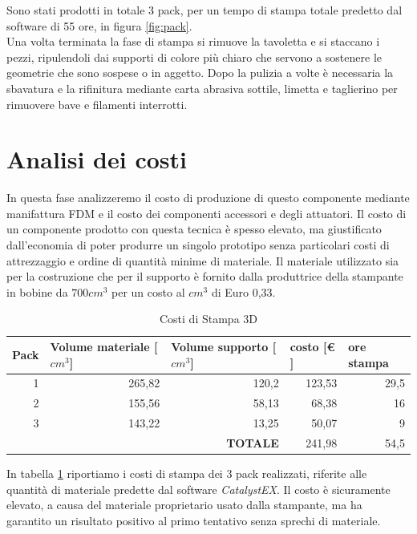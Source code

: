 \documentclass[%
corpo=11pt,
twoside,
 stile=classica,
oldstyle,
greek,%
]{toptesi}
\begin{document}
	Sono stati prodotti in totale 3 pack, per un tempo di stampa totale predetto dal software di 55 ore, in figura \ref{fig:pack}.\\
	Una volta terminata la fase di stampa si rimuove la tavoletta e si staccano i pezzi, ripulendoli dai supporti di colore più chiaro che servono a sostenere le geometrie che sono sospese o in aggetto. 
	Dopo la pulizia a volte è necessaria la sbavatura e la rifinitura mediante carta abrasiva sottile, limetta e taglierino per rimuovere bave e filamenti interrotti. 
	
	\section{Analisi dei costi}
	In questa fase analizzeremo il costo di produzione di questo componente mediante manifattura FDM e il costo dei componenti accessori e degli attuatori. 
	Il costo di un componente prodotto con questa tecnica è spesso elevato, ma giustificato dall'economia di poter produrre un singolo prototipo senza particolari costi di attrezzaggio e ordine di quantità minime di materiale. 
	Il materiale utilizzato sia per la costruzione che per il supporto è fornito dalla produttrice della stampante in bobine da $700 cm^3$ per un costo al $cm^3$ di Euro 0,33. 
	\begin{table}[H]
		\centering
		\caption{Costi di Stampa 3D}
		\begin{tabular}{rr|r|r|r|}
			\hline
			\multicolumn{1}{|l|}{\textbf{Pack}} & \multicolumn{1}{l|}{\textbf{Volume materiale [$cm^{3}$]}} & \multicolumn{1}{l|}{\textbf{Volume supporto [$cm^{3}$]}} & \multicolumn{1}{l|}{\textbf{costo [€ ]}} & \multicolumn{1}{l|}{\textbf{ore stampa}} \bigstrut\\
			\hline
			\multicolumn{1}{|r|}{1} & 265,82 & 120,2 & 123,53 & 29,5 \bigstrut\\
			\hline
			\multicolumn{1}{|r|}{2} & 155,56 & 58,13 & 68,38 & 16 \bigstrut\\
			\hline
			\multicolumn{1}{|r|}{3} & 143,22 & 13,25 & 50,07 & 9 \bigstrut\\
			\hline
			&       & \textbf{TOTALE} & 241,98 & 54,5 \bigstrut\\
			\cline{3-5}    \end{tabular}%
		\label{tab:printcost}%
	\end{table}%
	In tabella \ref{tab:printcost} riportiamo i costi di stampa dei 3 pack realizzati, riferite alle quantità di materiale predette dal software \textit{CatalystEX}. Il costo è sicuramente elevato, a causa del materiale proprietario usato dalla stampante, ma ha garantito un risultato positivo al primo tentativo senza sprechi di materiale. 
	
\end{document}
